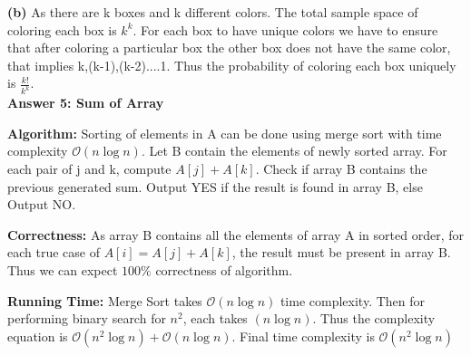 \documentclass{article}
\begin{document}
\textbf{(b)}
As there are k boxes and k different colors. The total sample space of coloring each box is $k^k$.
For each box to have unique colors we have to ensure that after coloring a particular box the other box does not have the same color, that implies k,(k-1),(k-2)....1. 
Thus the probability of coloring each box uniquely is $\frac {k!}{k^k}$.
\\[10pt]
\textbf{Answer 5: Sum of Array}

\textbf{Algorithm:}
Sorting of elements in A can be done using merge sort with time complexity $\mathcal{O}(n \log n)$. Let B contain the elements of newly sorted array. For each pair of j and k, compute $A[j] + A[k]$. Check if array B contains the previous generated sum. Output YES if the result is found in array B, else Output NO.

\textbf{Correctness:}
As array B contains all the elements of array A in sorted order, for each true case of $A[i] = A[j] + A[k]$, the result must be present in array B. Thus we can expect $100\%$ correctness of algorithm.

\textbf{Running Time:}
Merge Sort takes $\mathcal{O}(n \log n)$ time complexity. Then for performing binary search for $n^2$, each takes $(n \log n)$. Thus the complexity equation is $\mathcal{O}(n^2 \log n) + \mathcal{O}(n \log n)$. Final time complexity is $\mathcal{O}(n^2 \log n)$
\end{document}
